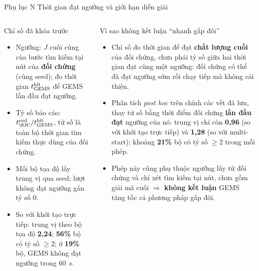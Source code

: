 \documentclass[aspectratio=169,10pt,t,xcolor={table}]{beamer}
\newcommand{\apptitle}[2]{Phụ lục #1 \textperiodcentered{} #2}
\begin{document}
\begin{frame}{\apptitle{N}{Thời gian đạt ngưỡng và giới hạn diễn giải}}
\begin{columns}[T,onlytextwidth]
\begin{block}{Chỉ số đã khóa trước}
\scriptsize
\begin{itemize}
\item Ngưỡng: $J$ cuối cùng của bước tìm kiếm tại nút của \textbf{đối chứng} (cùng seed); đo thời gian $t^{\rm hit}_{\rm GEMS}$ để GEMS lần đầu đạt ngưỡng.
\item Tỷ số báo cáo: $t^{\rm end}_{\rm ĐC}/t^{\rm hit}_{\rm GEMS}$, tử số là toàn bộ thời gian tìm kiếm thực dùng của đối chứng.
\item Mỗi bộ tọa độ lấy trung vị qua seed; lượt không đạt ngưỡng gán tỷ số 0.
\item So với khởi tạo trực tiếp: trung vị theo bộ tọa độ \textbf{2,24}; \textbf{56\%} bộ có tỷ số $\ge2$; ở \textbf{19\%} bộ, GEMS không đạt ngưỡng trong 60~s.
\end{itemize}
\end{block}
\begin{alertblock}{Vì sao không kết luận ``nhanh gấp đôi''}
\scriptsize
\begin{itemize}
\item Chỉ số đo thời gian để đạt \textbf{chất lượng cuối} của đối chứng, chưa phải tỷ số giữa hai thời gian đạt cùng một ngưỡng: đối chứng có thể đã đạt ngưỡng sớm rồi chạy tiếp mà không cải thiện.
\item Phân tích \emph{post hoc} trên chính các vết đã lưu, thay tử số bằng thời điểm đối chứng \textbf{lần đầu đạt} ngưỡng của nó: trung vị chỉ còn \textbf{0,96} (so với khởi tạo trực tiếp) và \textbf{1,28} (so với multi-start); khoảng \textbf{21\%} bộ có tỷ số $\ge2$ trong mỗi phép.
\item Phép này cũng phụ thuộc ngưỡng lấy từ đối chứng và chỉ xét tìm kiếm tại nút, chưa gồm giải mã cuối $\Rightarrow$ \textbf{không kết luận} GEMS tăng tốc cả phương pháp gấp đôi.
\end{itemize}
\end{alertblock}
\end{columns}
\end{frame}
\end{document}
